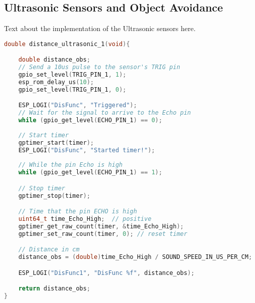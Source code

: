 \documentclass[../report.tex]{subfiles}
\begin{document}
\subsection{Ultrasonic Sensors and Object Avoidance}
Text about the implementation of the Ultrasonic sensors here.
\begin{lstlisting}[language=c,caption={The Ultrasonic Code},label={code:ultrasonic}]
    double distance_ultrasonic_1(void){

    double distance_obs;
    // Send a 10us pulse to the sensor's TRIG pin
    gpio_set_level(TRIG_PIN_1, 1);
    esp_rom_delay_us(10);
    gpio_set_level(TRIG_PIN_1, 0);

    ESP_LOGI("DisFunc", "Triggered");
    // Wait for the signal to arrive to the Echo pin
    while (gpio_get_level(ECHO_PIN_1) == 0);
    
    // Start timer 
    gptimer_start(timer);
    ESP_LOGI("DisFunc", "Started timer!");
    
    // While the pin Echo is high
    while (gpio_get_level(ECHO_PIN_1) == 1);

    // Stop timer
    gptimer_stop(timer);

    // Time that the pin ECHO is high 
    uint64_t time_Echo_High;  // positive
    gptimer_get_raw_count(timer, &time_Echo_High);  
    gptimer_set_raw_count(timer, 0); // reset timer

    // Distance in cm
    distance_obs = (double)time_Echo_High / SOUND_SPEED_IN_US_PER_CM;

    ESP_LOGI("DisFunc1", "DisFunc %f", distance_obs);

    return distance_obs;
}
\end{lstlisting}
\end{document}
